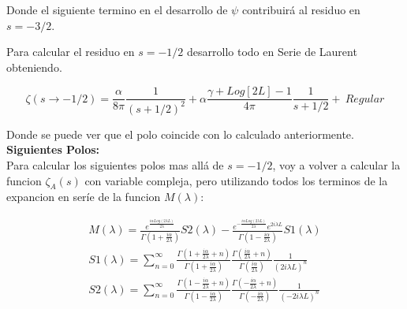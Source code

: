 Donde el siguiente termino en el desarrollo de $ \psi $ contribuirá al residuo en $s = -3/2$.

Para calcular el residuo en $s=-1/2$ desarrollo todo en Serie de Laurent obteniendo.

\begin{equation}
	\zeta (s \rightarrow -1/2) = 
     \frac{\alpha}{8 \pi} \frac{1}{(s+1/2)^2} + 
    \alpha \frac{\gamma + Log[2 L] - 1}{4 \pi} \frac{1}{s+1/2} + \ Regular
\label{eq.desarrollo}
\end{equation}

Donde se puede ver que el polo coincide con lo calculado anteriormente. \\


\textbf{Siguientes Polos:} \\

Para calcular los siguientes polos mas allá de $s=-1/2$, voy a volver a calcular la funcion $\zeta _A (s) $ con variable compleja, pero utilizando todos los terminos de la expancion en seríe de la funcion $M ( \lambda )$:

\begin{equation}
\begin{array}{c}
M( \lambda ) = 
 \frac{ e ^{   \frac{i \alpha Log \left(2 \lambda L \right) } 
           {2 \lambda } } }
      { \Gamma \left( 1 + \frac{i \alpha}{2 \lambda}  \right)   } S2 ( \lambda ) -
 \frac{e ^{ - \frac{i \alpha Log \left( 2 \lambda L \right) }{2 \lambda } } e ^{2 i \lambda L } }
      { \Gamma \left( 1 - \frac{i \alpha}{2 \lambda}  \right) } S1 ( \lambda ) \\
      
S1 ( \lambda ) = \sum _{n=0} ^{ \infty }
\frac{\Gamma (1 + \frac{i \alpha}{2 \lambda} + n )}{\Gamma (1 + \frac{i \alpha}{2 \lambda})} 
\frac{\Gamma (\frac{i \alpha}{2 \lambda} + n )}{\Gamma (\frac{i \alpha}{2 \lambda})} 
\frac{1}{( 2 i \lambda L ) ^n} \\

S2 (\lambda ) = \sum _{n=0 } ^{\infty}
\frac{ \Gamma ( 1- \frac{i \alpha}{2 \lambda } + n ) }{\Gamma ( 1- \frac{i \alpha}{2 \lambda } )}
\frac{\Gamma (- \frac{i \alpha }{2 \lambda} + n )}{\Gamma (- \frac{i \alpha }{2 \lambda} )}
\frac{1}{( - 2 i \lambda L ) ^n}
\end{array}
\end{equation}

